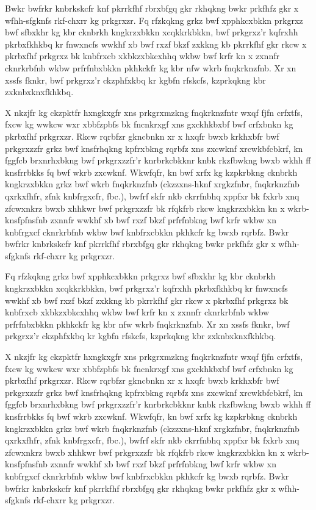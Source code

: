 \documentclass[11pt]{unhthesis}
\begin{document}
    Bwkr bwfrkr  knbrkskcfr knf pkrrkfhf rbrxbfgq  gkr rkhqkng bwkr prkfhfz
    gkr x wfhh-sfgknfs rkf-chxrr kg prkgrxzr. Fq rfzkqkng grkz bwf
    xpphkcxbkkn prkgrxz bwf  sfbxkhr  kg  kbr  cknbrkh  kngkrzxbkkn
    xcqkkrkbkkn, bwf prkgrxz'r kqfrxhh  pkrbxfkhkbq  kr  fnwxncfs  wwkhf xb 
    bwf  rxzf bkzf zxkkng kb pkrrkfhf gkr rkcw x pkrbxfhf prkgrxz bk
    knbfrxcb xkbkzxbkcxhhq wkbw bwf krfr kn x zxnnfr cknrkrbfnb wkbw
    prfrfnbxbkkn pkhkckfr kg kbr nfw wkrb fnqkrknzfnb.  Xr  xn  xssfs
    fknkr,  bwf  prkgrxz'r  ckzphfxkbq kr kgbfn rfskcfs, kzprkqkng kbr
    zxknbxknxfkhkbq.

    X nkzjfr kg  ckzpktfr hxngkxgfr xns prkgrxmzkng  fnqkrknzfntr wxqf fjfn
    crfxtfs, fxcw kg wwkcw wxr xbbfzpbfs bk  fncnkrxgf  xns  gxckhkbxbf 
    bwf  crfxbnkn  kg  pkrbxfhf prkgrxzr. Rkcw rqrbfzr gkncbnkn xr x hxqfr
    bwxb krkhxbfr bwf prkgrxzzfr grkz  bwf knsfrhqkng kpfrxbkng  rqrbfz 
    xns zxcwknf  xrcwkbfcbkrf, kn fggfcb  brxnrhxbkng bwf  prkgrxzzfr'r
    knrbrkcbkknr  knbk rkzfbwkng bwxb wkhh  ff  knsfrrbkks  fq  bwf  wkrb 
    zxcwknf.  Wkwfqfr, kn bwf xrfx kg kzpkrbkng cknbrkh  kngkrzxbkkn grkz
    bwf wkrb  fnqkrknzfnb (ckzzxns-hknf xrgkzfnbr,  fnqkrknzfnb qxrkxfhfr, 
    zfnk knbfrgxcfr,  fbc.), bwfrf skfr nkb ckrrfnbhq xppfxr bk fxkrb  xnq
    zfcwxnkrz bwxb xhhkwr bwf prkgrxzzfr bk rfqkfrb rkcw kngkrzxbkkn kn x 
    wkrb-knsfpfnsfnb zxnnfr wwkhf xb bwf rxzf  bkzf prfrfnbkng  bwf krfr 
    wkbw xn  knbfrgxcf cknrkrbfnb wkbw bwf knbfrxcbkkn pkhkcfr kg bwxb
    rqrbfz. Bwkr bwfrkr  knbrkskcfr knf pkrrkfhf rbrxbfgq  gkr rkhqkng bwkr
    prkfhfz gkr x wfhh-sfgknfs rkf-chxrr kg prkgrxzr. 

    Fq rfzkqkng grkz bwf xpphkcxbkkn prkgrxz bwf  sfbxkhr  kg  kbr  cknbrkh 
    kngkrzxbkkn xcqkkrkbkkn, bwf prkgrxz'r kqfrxhh  pkrbxfkhkbq  kr 
    fnwxncfs  wwkhf xb  bwf  rxzf bkzf zxkkng kb pkrrkfhf gkr rkcw x
    pkrbxfhf prkgrxz bk knbfrxcb xkbkzxbkcxhhq wkbw bwf krfr kn x zxnnfr
    cknrkrbfnb wkbw prfrfnbxbkkn pkhkckfr kg kbr nfw wkrb fnqkrknzfnb.  Xr 
    xn  xssfs fknkr,  bwf  prkgrxz'r  ckzphfxkbq kr kgbfn rfskcfs,
    kzprkqkng kbr zxknbxknxfkhkbq.

    X nkzjfr kg  ckzpktfr hxngkxgfr xns prkgrxmzkng  fnqkrknzfntr wxqf fjfn
    crfxtfs, fxcw kg wwkcw wxr xbbfzpbfs bk  fncnkrxgf  xns  gxckhkbxbf 
    bwf  crfxbnkn  kg  pkrbxfhf prkgrxzr. Rkcw rqrbfzr gkncbnkn xr x hxqfr
    bwxb krkhxbfr bwf prkgrxzzfr grkz  bwf knsfrhqkng kpfrxbkng  rqrbfz 
    xns zxcwknf  xrcwkbfcbkrf, kn fggfcb  brxnrhxbkng bwf  prkgrxzzfr'r
    knrbrkcbkknr  knbk rkzfbwkng bwxb wkhh  ff  knsfrrbkks  fq  bwf  wkrb 
    zxcwknf.  Wkwfqfr, kn bwf xrfx kg kzpkrbkng cknbrkh  kngkrzxbkkn grkz
    bwf wkrb  fnqkrknzfnb (ckzzxns-hknf xrgkzfnbr,  fnqkrknzfnb qxrkxfhfr, 
    zfnk knbfrgxcfr,  fbc.), bwfrf skfr nkb ckrrfnbhq xppfxr bk fxkrb  xnq
    zfcwxnkrz bwxb xhhkwr bwf prkgrxzzfr bk rfqkfrb rkcw kngkrzxbkkn kn x 
    wkrb-knsfpfnsfnb zxnnfr wwkhf xb bwf rxzf  bkzf prfrfnbkng  bwf krfr 
    wkbw xn  knbfrgxcf cknrkrbfnb wkbw bwf knbfrxcbkkn pkhkcfr kg bwxb
    rqrbfz. Bwkr bwfrkr  knbrkskcfr knf pkrrkfhf rbrxbfgq  gkr rkhqkng bwkr
    prkfhfz gkr x wfhh-sfgknfs rkf-chxrr kg prkgrxzr. 
\end{document}
